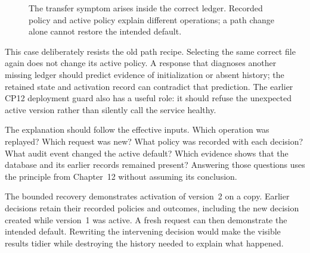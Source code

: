 \begin{figure}[H]\centering
{}
\caption{The transfer symptom arises inside the correct ledger. Recorded policy and active policy explain different operations; a path change alone cannot restore the intended default.}\label{fig:ch13-transfer}
\end{figure}

This case deliberately resists the old path recipe. Selecting the same correct file again does not change its active policy. A response that diagnoses another missing ledger should predict evidence of initialization or absent history; the retained state and activation record can contradict that prediction. The earlier CP12 deployment guard also has a useful role: it should refuse the unexpected active version rather than silently call the service healthy.

The explanation should follow the effective inputs. Which operation was replayed? Which request was new? What policy was recorded with each decision? What audit event changed the active default? Which evidence shows that the database and its earlier records remained present? Answering those questions uses the principle from Chapter~12 without assuming its conclusion.

The bounded recovery demonstrates activation of version~2 on a copy. Earlier decisions retain their recorded policies and outcomes, including the new decision created while version~1 was active. A fresh request can then demonstrate the intended default. Rewriting the intervening decision would make the visible results tidier while destroying the history needed to explain what happened.


